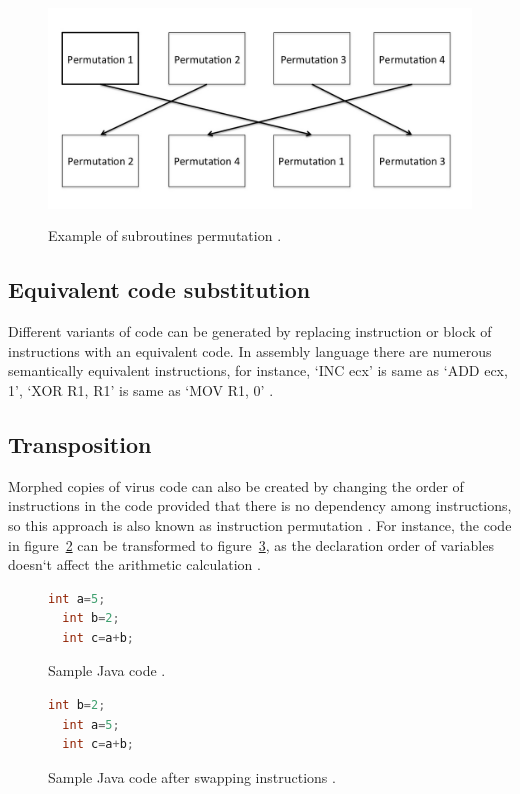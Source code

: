 \begin{figure}
  \centering
      \includegraphics[width=12cm, height=6cm]{subpermutation.jpg}
    \caption[Example of subroutines permutation]{Example of subroutines permutation \cite{bib23}.}
    \label{fig:subpermutation}
\end{figure}

\subsection{Equivalent code substitution} 
Different variants of code can be generated by replacing instruction or block of instructions with an equivalent code. In assembly language there are numerous semantically equivalent instructions, for instance, `INC ecx' is same as `ADD ecx, 1', `XOR R1, R1' is same as `MOV R1, 0' \cite{bib25}.

\subsection{Transposition} 
Morphed copies of virus code can also be created by changing the order of instructions in the code provided that there is no dependency among instructions, so this approach is also known as instruction permutation \cite{bib23}. For instance, the code in figure~\ref{fig:beforetrans} can be transformed to figure~\ref{fig:aftertrans}, as the declaration order of variables doesn`t affect the arithmetic calculation \cite{bib4}. 

\begin{figure}
  \centering
  \begin{lstlisting}[language=Java]
  int a=5;
  int b=2;
  int c=a+b;
\end{lstlisting}
    \caption[Sample Java code]{Sample Java code \cite{bib4}.}
    \label{fig:beforetrans}
\end{figure}

\begin{figure}
  \centering
  \begin{lstlisting}[language=Java]
  int b=2;
  int a=5;
  int c=a+b;
\end{lstlisting}
    \caption[Sample Java code after applying Transposition]{Sample Java code after swapping instructions  \cite{bib4}.}
    \label{fig:aftertrans}
\end{figure}

